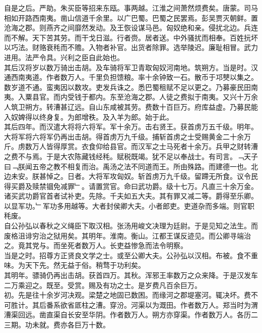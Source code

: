 \documentclass{zhvt-classic}
\begin{document}
\hspace*{2em}自是之后。严助。朱买臣等招来东瓯。事两越。江淮之间萧然烦费矣。唐蒙。司马相如开路西南夷。凿山信道千余里。以广巴蜀。巴蜀之民罢焉。彭吴贾灭朝鲜。置沧海之郡。则燕齐之间靡然发动。及王恢设谋马邑。匈奴绝和亲。侵扰北边。兵连而不解。天下苦其劳。而干戈日滋。行者赍。居者送。中外骚扰而相奉。百姓抏坏以巧法。财赂衰秏而不赡。入物者补官。出货者除罪。选举陵迟。廉耻相冒。武力进用。法严令具。兴利之臣自此始也。\\
\hspace*{2em}其后汉将岁以数万骑出击胡。及车骑将军卫青取匈奴河南地。筑朔方。当是时。汉通西南夷道。作者数万人。千里负担馈粮。率十余钟致一石。散币于邛僰以集之。数岁道不通。蛮夷因以数攻。吏发兵诛之。悉巴蜀租赋不足以更之。乃募豪民田南夷。入粟县官。而内受钱于都内。东至沧海之郡。人徒之费拟于南夷。又兴十万余人筑卫朔方。转漕甚辽远。自山东咸被其劳。费数十百巨万。府库益虚。乃募民能入奴婢得以终身复。为郎增秩。及入羊为郎。始于此。\\
\hspace*{2em}其后四年。而汉遣大将将六将军。军十余万。击右贤王。获首虏万五千级。明年。大将军将六将军仍再出击胡。得首虏万九千级。捕斩首虏之士受赐黄金二十余万斤。虏数万人皆得厚赏。衣食仰给县官。而汉军之士马死者十余万。兵甲之财转漕之费不与焉。于是大农陈藏钱经秏。赋税既竭。犹不足以奉战士。有司言。﹁天子曰﹁朕闻五帝之教不相复而治。禹汤之法不同道而王。所由殊路。而建德一也。北边未安。朕甚悼之。日者。大将军攻匈奴。斩首虏万九千级。留蹛无所食。议令民得买爵及赎禁锢免减罪﹂。请置赏官。命曰武功爵。级十七万。凡直三十余万金。诸买武功爵官首者试补吏。先除。千夫如五大夫。其有罪又减二等。爵得至乐卿。以显军功。﹂军功多用越等。大者封侯卿大夫。小者郎吏。吏道杂而多端。则官职秏废。\\
\hspace*{2em}自公孙弘以春秋之义绳臣下取汉相。张汤用峻文决理为廷尉。于是见知之法生。而废格沮诽穷治之狱用矣。其明年。淮南。衡山。江都王谋反迹见。而公卿寻端治之。竟其党与。而坐死者数万人。长吏益惨急而法令明察。\\
\hspace*{2em}当是之时。招尊方正贤良文学之士。或至公卿大夫。公孙弘以汉相。布被。食不重味。为天下先。然无益于俗。稍骛于功利矣。\\
\hspace*{2em}其明年。骠骑仍再出击胡。获首四万。其秋。浑邪王率数万之众来降。于是汉发车二万乘迎之。既至。受赏。赐及有功之士。是岁费凡百余巨万。\\
\hspace*{2em}初。先是往十余岁河决观。梁楚之地固已数困。而缘河之郡堤塞河。辄决坏。费不可胜计。其后番系欲省厎柱之漕。穿汾。河渠以为溉田。作者数万人。郑当时为渭漕渠回远。凿直渠自长安至华阴。作者数万人。朔方亦穿渠。作者数万人。各历二三期。功未就。费亦各巨万十数。\\
\end{document}
